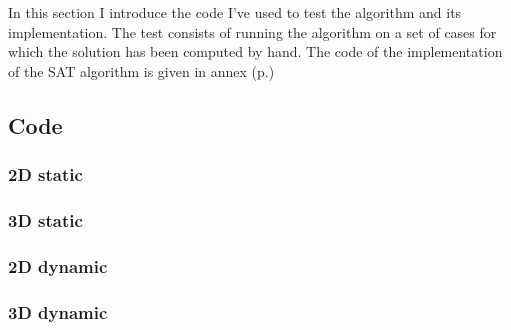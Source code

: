 \documentclass[12pt, a4paper]{article}
\begin{document}
In this section I introduce the code I've used to test the algorithm and its implementation. The test consists of running the algorithm on a set of cases for which the solution has been computed by hand. The code of the implementation of the SAT algorithm is given in annex (p.\pageref{sat_implementation})\\

\subsection{Code}

\subsubsection{2D static}

\begin{scriptsize}
\begin{ttfamily}

\end{ttfamily}
\end{scriptsize}

\subsubsection{3D static}

\begin{scriptsize}
\begin{ttfamily}

\end{ttfamily}
\end{scriptsize}

\subsubsection{2D dynamic}

\begin{scriptsize}
\begin{ttfamily}

\end{ttfamily}
\end{scriptsize}

\subsubsection{3D dynamic}

\begin{scriptsize}
\begin{ttfamily}

\end{ttfamily}
\end{scriptsize}
\end{document}
